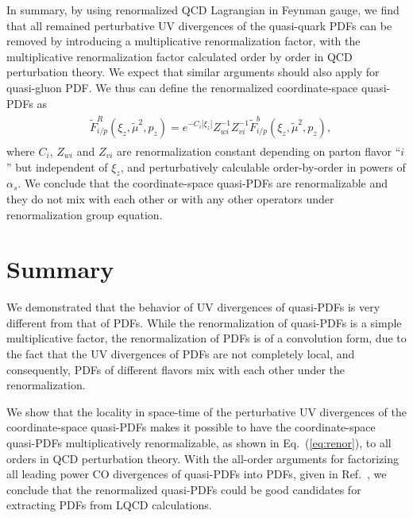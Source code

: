 \documentclass[twocolumn,aps,prd,superscriptaddress,nofootinbib,showpacs]{revtex4}
\begin{document}
In summary, by using renormalized QCD Lagrangian in Feynman gauge, we find that all remained perturbative UV divergences of the quasi-quark PDFs can be removed by introducing a multiplicative renormalization factor, with the multiplicative renormalization factor calculated order by order in QCD perturbation theory.  We expect that similar arguments should also apply for quasi-gluon PDF.  We thus can define the renormalized coordinate-space quasi-PDFs as
\begin{align}\label{eq:renor}
\begin{split}
&\tilde{F}^{R}_{i/p}(\xi_z,\tilde{\mu}^2,p_z)=e^{-C_i |\xi_z|}Z_{wi}^{-1}Z_{vi}^{-1}\tilde{F}^{b}_{i/p}(\xi_z,\tilde{\mu}^2,p_z),
\end{split}
\end{align}
where $C_i$, $Z_{wi}$ and $Z_{vi}$ are renormalization constant depending on parton flavor ``$i$'' but independent of $\xi_z$, and perturbatively calculable order-by-order in powers of $\alpha_s$.   We conclude that the coordinate-space quasi-PDFs are renormalizable and they do not mix with each other or with any other operators under renormalization group equation.



\section{Summary}
\label{sec:summary}

We demonstrated that the behavior of UV divergences of quasi-PDFs is very different from that of PDFs.  While the renormalization of quasi-PDFs is a simple multiplicative factor, the renormalization of PDFs is of a convolution form, due to the fact that the UV divergences of PDFs are not completely local, and consequently, PDFs of different flavors mix with each other under the renormalization.

We show that the locality in space-time of the perturbative UV divergences of the coordinate-space quasi-PDFs makes it possible to have the coordinate-space quasi-PDFs multiplicatively renormalizable, as shown in Eq.~(\ref{eq:renor}), to all orders in QCD perturbation theory.  With the all-order arguments for factorizing all leading power CO divergences of quasi-PDFs into PDFs, given in Ref.~\cite{Ma:2014jla}, we conclude that the renormalized quasi-PDFs could be good candidates for extracting PDFs from LQCD calculations.
\end{document}
